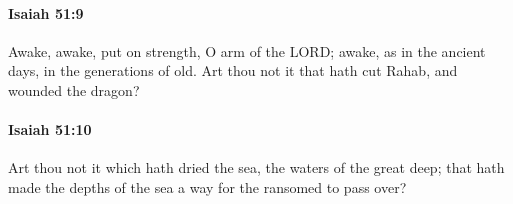 		\paragraph{Isaiah 51:9} %
			\label{ISAIAH-51-9}

			Awake, awake, put on strength, O arm of the LORD; awake, as in the ancient days, in the generations of old. Art thou not it that hath cut Rahab, and wounded the dragon?


		\paragraph{Isaiah 51:10} %
			\label{ISAIAH-51-10}

			Art thou not it which hath dried the sea, the waters of the great deep; that hath made the depths of the sea a way for the ransomed to pass over?


